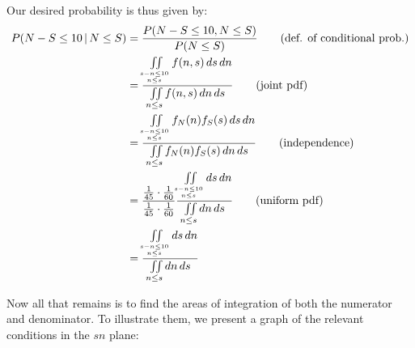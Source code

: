 \documentclass{article}
\newcommand*\eval[3]{\left[#1\right]_{#2}^{#3}}
\newcommand*\pbar[0]{\,|\,}
\begin{document}
Our desired probability is thus given by:
\begin{align*}
    P(N-S\le 10\pbar N\le S)&=\frac{P(N-S\le 10, N\le S)}{P(N\le S)}\tag{def. of conditional prob.}\\
    &=\frac{\iint\limits_{s-n\le10\atop n\le s}f(n,s)\mathop{ds}\mathop{dn}}{\iint\limits_{n\le s}f(n,s)\mathop{dn}\mathop{ds}}\tag{joint pdf}\\
    &=\frac{\iint\limits_{s-n\le10\atop n\le s}f_N(n)f_S(s)\mathop{ds}\mathop{dn}}{\iint\limits_{n\le s}f_N(n)f_S(s)\mathop{dn}\mathop{ds}}\tag{independence}\\
    &=\frac{\frac{1}{45}\cdot\frac{1}{60}}{\frac{1}{45}\cdot\frac{1}{60}}\frac{\iint\limits_{s-n\le10\atop n\le s}\mathop{ds}\mathop{dn}}{\iint\limits_{n\le s}\mathop{dn}\mathop{ds}}\tag{uniform pdf}\\
    &=\frac{\iint\limits_{s-n\le10\atop n\le s}\mathop{ds}\mathop{dn}}{\iint\limits_{n\le s}\mathop{dn}\mathop{ds}}
\end{align*}

Now all that remains is to find the areas of integration of both the numerator and denominator. To illustrate them, we present a graph of the relevant conditions in the $sn$ plane:
\end{document}
